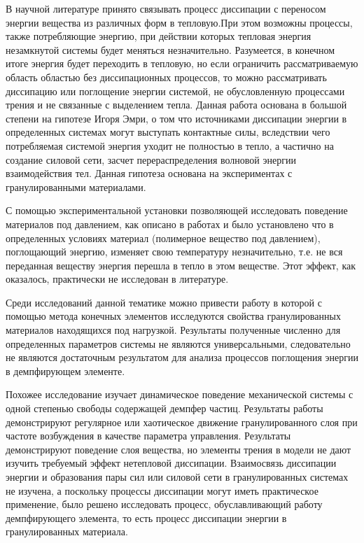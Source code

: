 В научной литературе принято связывать процесс диссипации с переносом энергии
вещества из различных форм в тепловую.При этом возможны процессы, также потребляющие энергию, при действии которых
тепловая энергия незамкнутой системы будет меняться незначительно. Разумеется, в
конечном итоге энергия будет переходить в тепловую, но если ограничить
рассматриваемую область областью без диссипационных процессов, то можно
рассматривать диссипацию или поглощение энергии системой, не обусловленную
процессами трения и не связанные с выделением тепла.
Данная работа основана в большой степени на гипотезе Игоря Эмри, о том что
источниками диссипации энергии в определенных системах могут выступать контактные
силы, вследствии чего потребляемая системой энергия уходит не полностью в тепло, а
частично на создание силовой сети, засчет перераспределения волновой энергии взаимодействия тел. Данная гипотеза основана на экспериментах \cite{work2, work7} с
гранулированными материалами. 

С помощью экспериментальной установки \cite{work2} позволяющей исследовать поведение
материалов под давлением, как описано в работах \cite{work2} и \cite{work7} было установлено что в
определенных условиях материал (полимерное вещество под давлением), поглощающий
энергию, изменяет свою температуру незначительно, т.е. не вся переданная веществу
энергия перешла в тепло в этом веществе. Этот эффект, как оказалось, практически не
исследован в литературе.

Среди исследований данной тематике можно привести работу \cite{work10} в которой с помощью
метода конечных элементов исследуются свойства гранулированных материалов
находящихся под нагрузкой. Результаты полученные численно для определенных
параметров системы не являются универсальными, следовательно не являются
достаточным результатом для анализа процессов поглощения энергии в демпфирующем
элементе.

Похожее исследование \cite{work11} изучает динамическое поведение механической системы с
одной степенью свободы содержащей демпфер частиц.
Результаты работы демонстрируют регулярное или хаотическое движение
гранулированного слоя при частоте возбуждения в качестве параметра управления.
Результаты демонстрируют поведение слоя вещества, но элементы трения в модели не
дают изучить требуемый эффект нетепловой диссипации.
Взаимосвязь диссипации энергии и образования пары сил или силовой сети в
гранулированных системах не изучена, а поскольку процессы диссипации могут иметь
практическое применение, было решено исследовать процесс, обуславливающий работу
демпфирующего элемента, то есть процесс диссипации энергии в гранулированных
материала.

